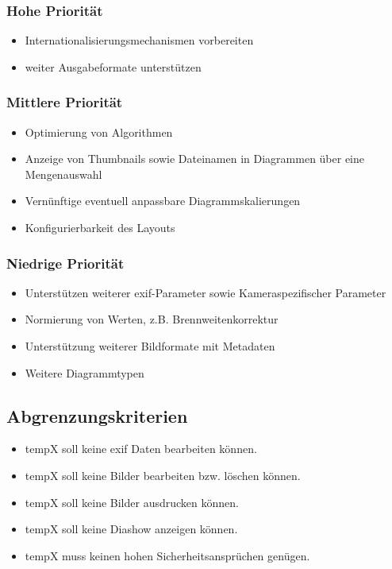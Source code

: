 \subsubsection{Hohe Priorität}
	\begin{itemize}
	\item Internationalisierungsmechanismen vorbereiten
	\item weiter Ausgabeformate unterstützen 
	\end{itemize}
\subsubsection{Mittlere Priorität}
	\begin{itemize}
	\item Optimierung von Algorithmen
	\item Anzeige von Thumbnails sowie Dateinamen in Diagrammen über eine Mengenauswahl
	\item Vernünftige eventuell anpassbare Diagrammskalierungen
	\item Konfigurierbarkeit des Layouts	
	\end{itemize}
\subsubsection{Niedrige Priorität}
	\begin{itemize}
	\item Unterstützen weiterer \gls{exif}-Parameter sowie Kameraspezifischer Parameter
	\item Normierung von Werten, z.B. Brennweitenkorrektur
 	\item Unterstützung weiterer Bildformate mit Metadaten 	
 	\item Weitere Diagrammtypen
	\end{itemize}


\subsection{Abgrenzungskriterien} 
\begin{itemize}
	\item \gls{tempX} soll keine \gls{exif} Daten bearbeiten können.
	\item \gls{tempX} soll keine Bilder bearbeiten bzw. löschen können.
	\item \gls{tempX} soll keine Bilder ausdrucken können.
	\item \gls{tempX} soll keine Diashow anzeigen können.
	\item \gls{tempX} muss keinen hohen Sicherheitsansprüchen genügen.
\end{itemize}
